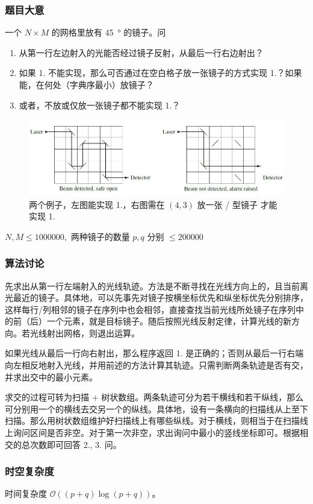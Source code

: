 			\subsubsection{题目大意}
				一个 $N \times M$ 的网格里放有 \SI{45}{\degree} 的镜子。问
				\begin{enumerate}
					\item 从第一行左边射入的光能否经过镜子反射，从最后一行右边射出？
					\item 如果 1. 不能实现，那么可否通过在空白格子放一张镜子的方式实现 1.？如果能，在何处（字典序最小）放镜子？
					\item 或者，不放或仅放一张镜子都不能实现 1.？
				\end{enumerate}
				\begin{figure}[!htb]
 					\centering
					\includegraphics[width=0.8 \textwidth]{4.jpg}
					\caption{两个例子，左图能实现 1.，右图需在 $(4,3) $ 放一张 / 型镜子 才能实现 1.}
				\end{figure}
				
				$N,M \le \num{1 000 000},$ 两种镜子的数量 $p,q$ 分别 $\le \num{200 000}$
			\subsubsection{算法讨论}
				先求出从第一行左端射入的光线轨迹。方法是不断寻找在光线方向上的，且当前离光最近的镜子。具体地，可以先事先对镜子按横坐标优先和纵坐标优先分别排序，这样每行/列相邻的镜子在序列中也会相邻，直接查找当前光线所处镜子在序列中的前（后）一个元素，就是目标镜子。随后按照光线反射定律，计算光线的新方向。若光线射出网格，则退出运算。
					
				如果光线从最后一行向右射出，那么程序返回 1. 是正确的；否则从最后一行右端向左相反地射入光线，并用前述的方法计算其轨迹。只需判断两条轨迹是否有交，并求出交中的最小元素。
					
				求交的过程可转为扫描 $+$ 树状数组。两条轨迹可分为若干横线和若干纵线，那么可分别用一个的横线去交另一个的纵线。具体地，设有一条横向的扫描线从上至下扫描。那么用树状数组维护好扫描线上有哪些纵线。对于横线，则相当于在扫描线上询问区间是否非空。对于第一次非空，求出询问中最小的竖线坐标即可。根据相交的总次数即可回答 2., 3. 问。
			\subsubsection{时空复杂度}
				时间复杂度 $\mathcal{O}\left((p+q)\log(p+q) \right)$。
					
